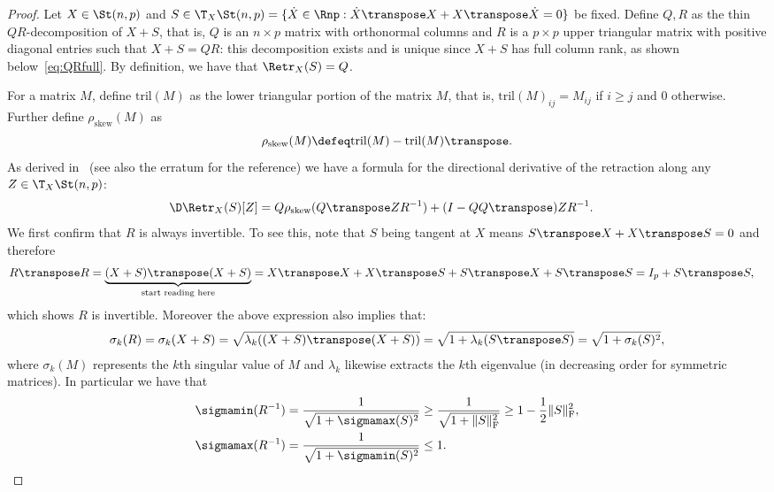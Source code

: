 \begin{proof}
Let $X \in \St(n, p)$ and $S \in \T_X \St(n, p) = \{ \dot X \in \Rnp : \dot X\transpose  X + X\transpose \dot X = 0 \}$ be fixed. Define $Q,R$ as the thin $QR$-decomposition of $X + S$, that is, $Q$ is an $n \times p$ matrix with orthonormal columns and $R$ is a $p \times p$ upper triangular matrix with positive diagonal entries such that $X+S = QR$: this decomposition exists and is unique since $X+S$ has full column rank, as shown below~\eqref{eq:QRfull}. By definition, we have that $\Retr_X(S) = Q$. 

For a matrix $M$, define $\mathrm{tril}(M)$ as the lower triangular portion of the matrix $M$, that is, $\mathrm{tril}(M)_{ij} = M_{ij}$ if $i \geq j$ and 0 otherwise. Further define $\rho_{\mathrm{skew}}(M)$ as  
\[\rho_{\mathrm{skew}}(M) \defeq \mathrm{tril}(M) - \mathrm{tril}(M)\transpose.\]
As derived in~\citep[Ex.~8.1.5]{AMS08} (see also the erratum for the reference) we have a formula for the directional derivative of the retraction along any $Z \in \T_X \St(n, p)$:
\begin{align}
	\D\Retr_X(S)[Z] & = Q\rho_{\mathrm{skew}}(Q\transpose Z R^{-1}) + (I-QQ\transpose) Z R^{-1}.
	\label{eq:DRetrQR}
\end{align}
We first confirm that $R$ is always invertible. To see this, note that $S$ being tangent at $X$ means $S\transpose X + X\transpose S = 0$ and therefore
\begin{align}
	R\transpose R & = \underbrace{(X+S)\transpose (X + S)}_{\textrm{start reading here}} = X\transpose X + X\transpose S + S\transpose X + S\transpose S = I_p + S\transpose S,
	\label{eq:QRfull}
\end{align}
which shows $R$ is invertible. Moreover the above expression also implies that:
\begin{align*}
	\sigma_k(R) = \sigma_k(X + S) = \sqrt{\lambda_k((X+S)\transpose (X+S))} = \sqrt{1 + \lambda_k(S\transpose S)} = \sqrt{1 + \sigma_k(S)^2},
\end{align*}
where $\sigma_k(M)$ represents the $k$th singular value of $M$ and $\lambda_k$ likewise extracts the $k$th eigenvalue (in decreasing order for symmetric matrices).
In particular we have that
\begin{align}
	\sigmamin(R^{-1}) & = \frac{1}{\sqrt{1 + \sigmamax(S)^2}} \geq \frac{1}{\sqrt{1 + \|S\|_{\mathrm{F}}^2}} \geq 1 - \frac{1}{2}\|S\|_{\mathrm{F}}^2, \nonumber\\
	\sigmamax(R^{-1}) & = \frac{1}{\sqrt{1 + \sigmamin(S)^2}} \leq 1. \label{eqn:sigmamaxbound}

\end{align}
\end{proof}

